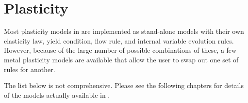 \chapter{Plasticity}

Most plasticity models in \Vaango are implemented as stand-alone models with
their own elasticity law, yield condition, flow rule, and internal variable
evolution rules.  However, because of the large number of possible combinations
of these, a few metal plasticity models are available that allow the user to
swap out one set of rules for another.
  
\begin{NoteBox}
  The list below is not comprehensive.  Please see the following chapters
  for details of the models actually available in \Vaango.
\end{NoteBox}

